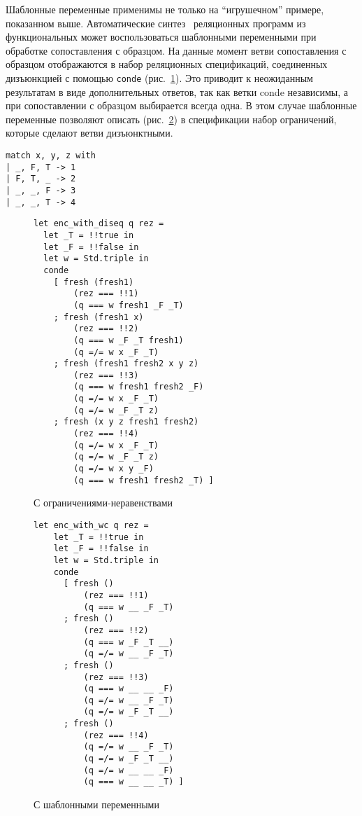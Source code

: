 Шаблонные переменные применимы не только на \enquote{игрушечном} примере, показанном выше.
Автоматические синтез~\cite{Lozov2018} реляционных программ из функциональных может воспользоваться шаблонными переменными при обработке сопоставления с образцом.
На данные момент ветви сопоставления с образцом отображаются в набор реляционных спецификаций, соединенных дизъюнкцией с помощью \verb=conde= (рис.~\ref{fig:matching-example3}).
Это приводит к неожиданным результатам в виде дополнительных ответов, так как ветки conde независимы, а при сопоставлении с образцом выбирается всегда одна.
В этом случае шаблонные переменные позволяют описать (рис.~\ref{fig:matching-example4}) в спецификации набор ограничений, которые сделают ветви дизъюнктными.


\begin{figure*}[t!]
  \centering
  \renewcommand\thesubfigure{\alph{subfigure}1}
  \begin{lstlisting}
match x, y, z with
| _, F, T -> 1
| F, T, _ -> 2
| _, _, F -> 3
| _, _, T -> 4
  \end{lstlisting}
  \vskip4.5mm
  \caption{Пример сопоставления с обрацом в языке OCaml}
  \label{fig:matching-example1}
\end{figure*}

\begin{figure*}[t]
\begin{subfigure}{0.49\textwidth}
\begin{lstlisting}
let enc_with_diseq q rez =
  let _T = !!true in
  let _F = !!false in
  let w = Std.triple in
  conde
    [ fresh (fresh1)
        (rez === !!1)
        (q === w fresh1 _F _T)
    ; fresh (fresh1 x)
        (rez === !!2)
        (q === w _F _T fresh1)
        (q =/= w x _F _T)
    ; fresh (fresh1 fresh2 x y z)
        (rez === !!3)
        (q === w fresh1 fresh2 _F)
        (q =/= w x _F _T)
        (q =/= w _F _T z)
    ; fresh (x y z fresh1 fresh2)
        (rez === !!4)
        (q =/= w x _F _T)
        (q =/= w _F _T z)
        (q =/= w x y _F)
        (q === w fresh1 fresh2 _T) ]
\end{lstlisting}
\caption{С ограничениями-неравенствами}
\label{fig:matching-example3}
\end{subfigure}
\begin{subfigure}{0.49\textwidth}
\begin{lstlisting}
let enc_with_wc q rez =
    let _T = !!true in
    let _F = !!false in
    let w = Std.triple in
    conde
      [ fresh ()
          (rez === !!1)
          (q === w __ _F _T)
      ; fresh ()
          (rez === !!2)
          (q === w _F _T __)
          (q =/= w __ _F _T)
      ; fresh ()
          (rez === !!3)
          (q === w __ __ _F)
          (q =/= w __ _F _T)
          (q =/= w _F _T __)
      ; fresh ()
          (rez === !!4)
          (q =/= w __ _F _T)
          (q =/= w _F _T __)
          (q =/= w __ __ _F)
          (q === w __ __ _T) ]
\end{lstlisting}
\caption{С шаблонными переменными}
\label{fig:matching-example4}
\end{subfigure}
\caption{Две возможноые трансляции примера с Рис.~\ref{fig:match-example1}}
\label{fig:maranget-example-compilation}
\end{figure*}

